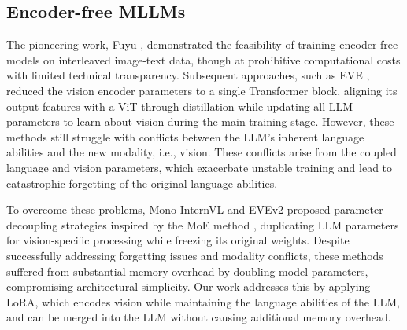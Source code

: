 \subsection{Encoder-free MLLMs}
The pioneering work, Fuyu \cite{fuyu}, demonstrated the feasibility of training encoder-free models on interleaved image-text data, though at prohibitive computational costs with limited technical transparency. Subsequent approaches, such as EVE \cite{eve}, reduced the vision encoder parameters to a single Transformer block, aligning its output features with a ViT through distillation while updating all LLM parameters to learn about vision during the main training stage. However, these methods still struggle with conflicts between the LLM’s inherent language abilities and the new modality, i.e., vision. These conflicts arise from the coupled language and vision parameters, which exacerbate unstable training and lead to catastrophic forgetting of the original language abilities.

To overcome these problems, Mono-InternVL \cite{monointernvl} and EVEv2 \cite{evev2} proposed parameter decoupling strategies inspired by the MoE method \cite{moe}, duplicating LLM parameters for vision-specific processing while freezing its original weights. Despite successfully addressing forgetting issues and modality conflicts, these methods suffered from substantial memory overhead by doubling model parameters, compromising architectural simplicity. 
Our work addresses this by applying LoRA, which encodes vision while maintaining the language abilities of the LLM, and can be merged into the LLM without causing additional memory overhead.


